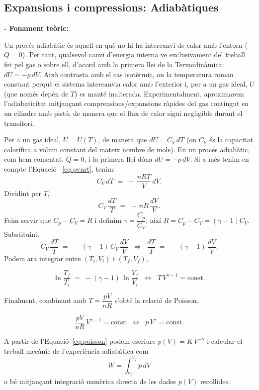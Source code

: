 \documentclass[a4paper,twoside,12pt]{article}
\theoremstyle{definition}
\begin{document}
	
	\subsection{Expansions i compressions: Adiabàtiques}
	
	\textbf{- Fonament teòric:}
	
	Un procés adiabàtic és aquell en què no hi ha intercanvi de calor amb l’entorn ($Q=0$). Per tant, qualsevol canvi d’energia interna ve exclusivament del treball fet pel gas o sobre ell, d’acord amb la primera llei de la Termodinàmica: $dU=-p\,dV$. Això contrasta amb el cas isotèrmic, on la temperatura roman constant perquè el sistema intercanvia calor amb l’exterior i, per a un gas ideal, $U$ (que només depèn de $T$) es manté inalterada. Experimentalment, aproximarem l’adiabaticitat mitjançant comprensions/expansions ràpides del gas contingut en un cilindre amb pistó, de manera que el flux de calor sigui negligible durant el transitori.
	

Per a un gas ideal, $U=U(T)$, de manera que $dU=C_V\,dT$ (on $C_V$ és la capacitat calorífica a volum constant del mateix nombre de mols). En un procés adiabàtic, com hem comentat, $Q=0$, i la primera llei dóna $dU=-p\,dV$. Si a més tenim en compte l'Equació ~\ref{eq:pvnrt}, tenim:
\[
C_V\,dT \;=\; -\,\frac{nRT}{V}\,dV.
\]
Dividint per $T$,
\[
C_V\,\frac{dT}{T} \;=\; -\,nR\,\frac{dV}{V}.
\]
Feim servir que $C_p-C_V=R$ i definim $\gamma=\dfrac{C_p}{C_V}$; així $R=C_p-C_V=(\gamma-1)C_V$. Substituint,
\[
C_V\,\frac{dT}{T} \;=\; -\,(\gamma-1)\,C_V\,\frac{dV}{V}
\;\;\Longrightarrow\;\;
\frac{dT}{T} \;=\; -\,(\gamma-1)\,\frac{dV}{V}.
\]
Podem ara integrar entre $(T_i,V_i)$ i $(T_f,V_f)$,

\begin{equation}
	\label{eq:TVgamma}
	\ln\!\frac{T_f}{T_i} \;=\; -(\gamma-1)\,\ln\!\frac{V_f}{V_i}
	\;\;\Longleftrightarrow\;\;
	T\,V^{\gamma-1}=\text{const} .
\end{equation}

Finalment, combinant amb $T=\dfrac{pV}{nR}$ s'obté la relació de Poisson,

\begin{equation}
	\label{eq:poisson}
	\frac{pV}{nR}\,V^{\gamma-1}=\text{const}
	\;\;\Longleftrightarrow\;\;
	p\,V^{\gamma}=\text{const}.
\end{equation}


	A partir de l'Equació~\ref{eq:poisson} podem escriure $p(V)=K\,V^{-\gamma}$ i calcular el treball mecànic de l'experiència adiabàtica com
	\begin{equation}
		\label{eq:Wadi}
		W=\int_{V_i}^{V_f} p\,dV
	\end{equation}
	o bé mitjançant integració numèrica directa de les dades $p(V)$ recollides.
	
\end{document}
